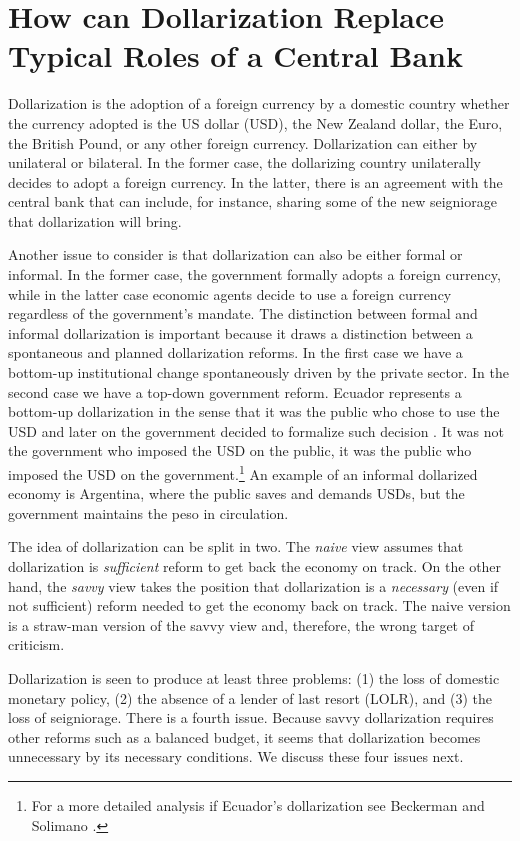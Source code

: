 \documentclass[12pt]{article}
\begin{document}
\section{How can Dollarization Replace Typical Roles of a Central Bank}
    \label{sec:debate}

Dollarization is the adoption of a foreign currency by a domestic country whether the currency adopted is the US dollar (USD), the New Zealand dollar, the Euro, the British Pound, or any other foreign currency. Dollarization can either by unilateral or bilateral. In the former case, the dollarizing country unilaterally decides to adopt a foreign currency. In the latter, there is an agreement with the central bank that can include, for instance, sharing some of the new seigniorage that dollarization will bring.

Another issue to consider is that dollarization can also be either formal or informal. In the former case, the government formally adopts a foreign currency, while in the latter case economic agents decide to use a foreign currency regardless of the government's mandate. The distinction between formal and informal dollarization is important because it draws a distinction between a spontaneous and planned dollarization reforms. In the first case we have a bottom-up institutional change spontaneously driven by the private sector. In the second case we have a top-down government reform. Ecuador represents a bottom-up dollarization in the sense that it was the public who chose to use the USD and later on the government decided to formalize such decision \parencite{White2014a}. It was not the government who imposed the USD on the public, it was the public who imposed the USD on the government.\footnote{For a more detailed analysis if Ecuador's dollarization see Beckerman and Solimano \parencite*{Beckerman2002}.} An example of an informal dollarized economy is Argentina, where the public saves and demands USDs, but the government maintains the peso in circulation.

The idea of dollarization can be split in two. The \textit{naive} view assumes that dollarization is \textit{sufficient} reform to get back the economy on track. On the other hand, the \textit{savvy} view takes the position that dollarization is a \textit{necessary} (even if not sufficient) reform needed to get the economy back on track. The naive version is a straw-man version of the savvy view and, therefore, the wrong target of criticism. 

Dollarization is seen to produce at least three problems: (1) the loss of domestic monetary policy, (2) the absence of a lender of last resort (LOLR), and (3) the loss of seigniorage. There is a fourth issue. Because savvy dollarization requires other reforms such as a balanced budget, it seems that dollarization becomes unnecessary by its necessary conditions. We discuss these four issues next.
\end{document}
